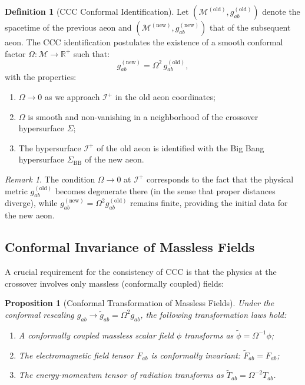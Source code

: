 \documentclass[11pt,a4paper]{article}
\theoremstyle{plain}
\newtheorem{proposition}[theorem]{Proposition}
\theoremstyle{definition}
\newtheorem{definition}[theorem]{Definition}
\theoremstyle{remark}
\newtheorem{remark}[theorem]{Remark}
\newcommand{\scriplus}{\mathcal{I}^+}
\newcommand{\sigmabb}{\Sigma_{\mathrm{BB}}}
\begin{document}
\begin{definition}[CCC Conformal Identification]\label{def:ccc_identification}
Let $(\mathcal{M}^{(\text{old})}, g_{ab}^{(\text{old})})$ denote the spacetime of the previous aeon and $(\mathcal{M}^{(\text{new})}, g_{ab}^{(\text{new})})$ that of the subsequent aeon. The CCC identification postulates the existence of a smooth conformal factor $\Omega: \mathcal{M} \to \mathbb{R}^+$ such that:
\begin{equation}\label{eq:conformal_rescaling}
    g_{ab}^{(\text{new})} = \Omega^2 \, g_{ab}^{(\text{old})},
\end{equation}
with the properties:
\begin{enumerate}
    \item $\Omega \to 0$ as we approach $\scriplus$ in the old aeon coordinates;
    \item $\Omega$ is smooth and non-vanishing in a neighborhood of the crossover hypersurface $\Sigma$;
    \item The hypersurface $\scriplus$ of the old aeon is identified with the Big Bang hypersurface $\sigmabb$ of the new aeon.
\end{enumerate}
\end{definition}

\begin{remark}
The condition $\Omega \to 0$ at $\scriplus$ corresponds to the fact that the physical metric $g_{ab}^{(\text{old})}$ becomes degenerate there (in the sense that proper distances diverge), while $g_{ab}^{(\text{new})} = \Omega^2 g_{ab}^{(\text{old})}$ remains finite, providing the initial data for the new aeon.
\end{remark}

\subsection{Conformal Invariance of Massless Fields}

A crucial requirement for the consistency of CCC is that the physics at the crossover involves only massless (conformally coupled) fields:

\begin{proposition}[Conformal Transformation of Massless Fields]\label{prop:conformal_massless}
Under the conformal rescaling $g_{ab} \to \tilde{g}_{ab} = \Omega^2 g_{ab}$, the following transformation laws hold:
\begin{enumerate}
    \item A conformally coupled massless scalar field $\phi$ transforms as $\tilde{\phi} = \Omega^{-1} \phi$;
    \item The electromagnetic field tensor $F_{ab}$ is conformally invariant: $\tilde{F}_{ab} = F_{ab}$;
    \item The energy-momentum tensor of radiation transforms as $\tilde{T}_{ab} = \Omega^{-2} T_{ab}$.
\end{enumerate}
\end{proposition}
\end{document}
